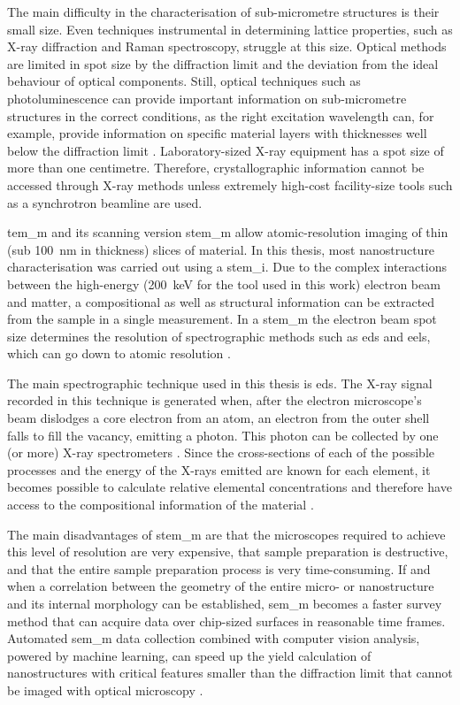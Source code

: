 The main difficulty in the characterisation of sub-micrometre structures is their small size. Even techniques instrumental in determining lattice properties, such as X-ray diffraction and Raman spectroscopy, struggle at this size. Optical methods are limited in spot size by the diffraction limit and the deviation from the ideal behaviour of optical components. Still, optical techniques such as photoluminescence can provide important information on sub-micrometre structures in the correct conditions, as the right excitation wavelength can, for example, provide information on specific material layers with thicknesses well below the diffraction limit \cite{Scherrer2021}. Laboratory-sized X-ray equipment has a spot size of more than one centimetre. Therefore, crystallographic information cannot be accessed through X-ray methods unless extremely high-cost facility-size tools such as a synchrotron beamline are used. 

\Acf{tem_m} and its scanning version \acf{stem_m} allow atomic-resolution imaging of thin (sub \qty{100}{\nano\metre} in thickness) slices of material. In this thesis, most nanostructure characterisation was carried out using a \acl{stem_i}. Due to the complex interactions between the high-energy (\qty{200}{\kilo\eV} for the tool used in this work) electron beam and matter, a compositional as well as structural information can be extracted from the sample in a single measurement. In a \acs{stem_m} the electron beam spot size determines the resolution of spectrographic methods such as \acf{eds} and \acf{eels}, which can go down to atomic resolution \cite{Bologna2018}. 

The main spectrographic technique used in this thesis is \acs{eds}. The X-ray signal recorded in this technique is generated when, after the electron microscope's beam dislodges a core electron from an atom, an electron from the outer shell falls to fill the vacancy, emitting a photon. This photon can be collected by one (or more) X-ray spectrometers \cite{EBNESAJJAD201439}. Since the cross-sections of each of the possible processes and the energy of the X-rays emitted are known for each element, it becomes possible to calculate relative elemental concentrations and therefore have access to the compositional information of the material \cite{Amari2012}.

The main disadvantages of \acs{stem_m} are that the microscopes required to achieve this level of resolution are very expensive, that sample preparation is destructive, and that the entire sample preparation process is very time-consuming. If and when a correlation between the geometry of the entire micro- or nanostructure and its internal morphology can be established, \acf{sem_m} becomes a faster survey method that can acquire data over chip-sized surfaces in reasonable time frames. Automated \acs{sem_m} data collection combined with computer vision analysis, powered by machine learning, can speed up the yield calculation of nanostructures with critical features smaller than the diffraction limit that cannot be imaged with optical microscopy \cite{Lin2022, Modarres2017, Lee2020}.